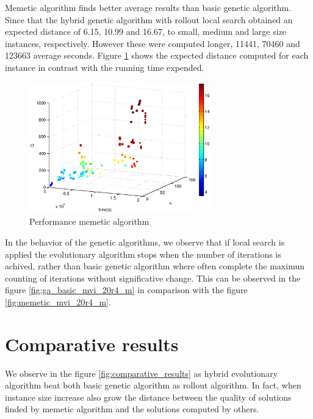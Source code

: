 Memetic algorithm finds better average results than basic genetic algorithm. Since that the hybrid genetic algorithm with rollout local search obtained an expected distance of 6.15, 10.99 and 16.67, to small, medium and large size instances, respectively. However these were computed longer, 
11441, 70460 and 123663 average seconds. Figure \ref{fig:compare_expected_distance_memetic} shows the expected distance computed for each instance in contrast with the running time expended.


\begin{figure}[!htbp]
  \begin{center}
   \includegraphics[width=0.7\textwidth]{Images/Chapter5/compare_expected_distance_memetic.eps}
  \end{center}
    \caption{Performance memetic algorithm}\label{fig:compare_expected_distance_memetic}
\end{figure}


In the behavior of the genetic algorithms, we observe that if local search is applied the evolutionary algorithm stops when the number of iterations is achived, rather than basic genetic algorithm where often complete the maximun counting of iterations without significative change. This can be observed in the figure \ref{fig:ga_basic_mvi_20r4_m} in comparison with the figure \ref{fig:memetic_mvi_20r4_m}.


\section{Comparative results}

We observe in the figure \ref{fig:comparative_results} as hybrid evolutionary algorithm beat both basic genetic algorithm as rollout algorithm. In fact, when instance size increase also grow the distance between the quality of solutions finded by memetic algorithm and the solutions computed by others.

